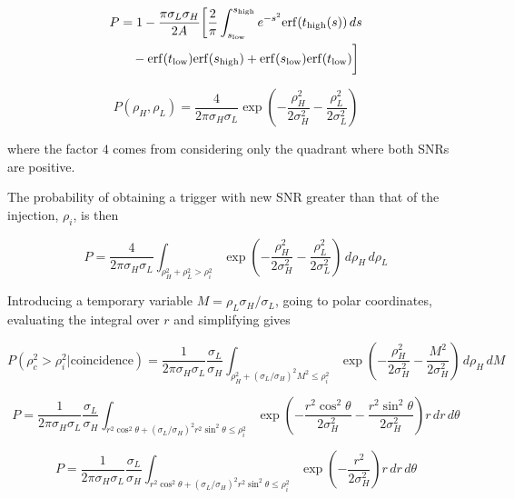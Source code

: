 \begin{align*}
P &= 1 - \frac{\pi\sigma_L \sigma_H}{2 A} \bigg[
\frac{2}{\pi} \int_{s_{\mathrm{low}}}^{s_{\mathrm{high}}} e^{-s^2}
\mathrm{erf}(t_{\mathrm{high}}(s))\,ds \nonumber \\
&\quad - \mathrm{erf}(t_{\mathrm{low}}) \mathrm{erf}(s_{\mathrm{high}})  
+ \mathrm{erf}(s_{\mathrm{low}}) \mathrm{erf} (t_{\mathrm{low}}) \bigg] \\
\end{align*}


\iffalse
\begin{equation}
P(\rho_H,\rho_L) = 
\frac{4}{2\pi \sigma_H \sigma_L} 
\exp\left(
-\frac{\rho_H^2}{2\sigma_H^2} -\frac{\rho_L^2}{2\sigma_L^2}
\right)
\end{equation}

where the factor $4$ comes from considering only the quadrant where
both SNRs are positive.

The probability of obtaining a trigger with new SNR greater than
that of the injection, $\rho_i$, is then

\begin{equation}
P = 
\frac{4}{2\pi \sigma_H \sigma_L} 
\int_{\rho_H^2 + \rho_L^2 > \rho_i^2}
\exp\left(
-\frac{\rho_H^2}{2\sigma_H^2} -\frac{\rho_L^2}{2\sigma_L^2}
\right)
\,d\rho_H\,d\rho_L
\end{equation}

Introducing a temporary variable $M = \rho_L \sigma_H/\sigma_L$, going to polar
coordinates, evaluating the integral over $r$ and simplifying gives


\begin{equation}
P(\rho_c^2 > \rho_i^2|\textrm{coincidence}) = 
\frac{1}{2\pi \sigma_H \sigma_L} 
\frac{\sigma_L}{\sigma_H}
\int_{\rho_H^2 + (\sigma_L/\sigma_H)^2 M^2 \leq \rho_i^2}
\exp\left(
-\frac{\rho_H^2}{2\sigma_H^2} -\frac{M^2}{2\sigma_H^2}
\right)
\,d\rho_H\,dM
\end{equation}



\begin{equation}
P = 
\frac{1}{2\pi \sigma_H \sigma_L} 
\frac{\sigma_L}{\sigma_H}
\int_{r^2\cos^2\theta + (\sigma_L/\sigma_H)^2 r^2\sin^2\theta \leq \rho_i^2}
\exp\left(
-\frac{r^2\cos^2\theta}{2\sigma_H^2} -\frac{r^2\sin^2\theta}{2\sigma_H^2}
\right)
r\, dr\, d\theta
\end{equation}


\begin{equation}
P = 
\frac{1}{2\pi \sigma_H \sigma_L} 
\frac{\sigma_L}{\sigma_H}
\int_{r^2\cos^2\theta + (\sigma_L/\sigma_H)^2 r^2\sin^2\theta \leq \rho_i^2}
\exp\left( -\frac{r^2}{2\sigma_H^2} \right)
r\, dr\, d\theta
\end{equation}


